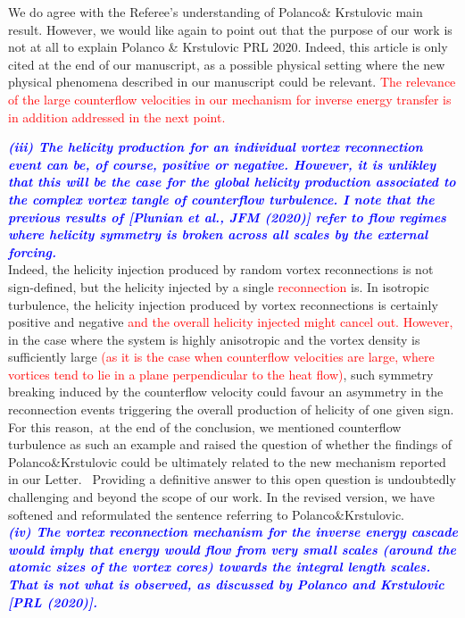 \documentclass[a4paper,10pt]{article}
\def\red#1{\textcolor{red}{#1}}
\def\blue#1{\textcolor{blue}{#1}}
\def\refcomment#1{\textbf{\blue{\emph{#1}}}\\}
\begin{document}
We do agree with the Referee’s understanding of Polanco\& Krstulovic main result. 
However, we would like again to point out that the purpose of our work is not at all to explain Polanco \& Krstulovic PRL 2020. Indeed, this article is only cited at the end of our manuscript, as a possible physical setting where the new physical phenomena described in our manuscript could be relevant. \red{The relevance of the large counterflow velocities in our mechanism for inverse energy transfer is in addition addressed in the next point.}
 


\refcomment{(iii) The helicity production for an individual vortex reconnection event can be, of course, positive or negative. However, it is unlikley that this will be the case for the global helicity production associated to the complex vortex tangle of counterflow turbulence. I note that the previous results of [Plunian et al., JFM (2020)] refer to flow regimes where helicity symmetry is broken across all scales by the external forcing.}

Indeed, the helicity injection produced by random vortex reconnections 
is not sign-defined, but the helicity injected by a single \red{reconnection}
is.  In isotropic turbulence, the helicity injection produced by vortex reconnections is certainly positive and negative \red{and the overall helicity injected
might cancel out. However,} in the case where the system is highly anisotropic and the vortex density is sufficiently large \red{(as it is the case when counterflow velocities are large, where vortices tend to lie in a plane perpendicular to the heat flow)}, such symmetry breaking induced by the counterflow velocity could favour an asymmetry in the reconnection events triggering the overall production of helicity of one given sign. For this reason, at the end of the conclusion, we mentioned counterflow turbulence as such an example and raised the question of whether the findings of Polanco\&Krstulovic could be ultimately related to the new mechanism reported in our Letter.  Providing a definitive answer to this open question is undoubtedly challenging and beyond the scope of our work. In the revised version, we have softened and reformulated the sentence referring to Polanco\&Krstulovic.\\

\refcomment{(iv) The vortex reconnection mechanism for the inverse energy cascade would imply that energy would flow from very small scales (around the atomic sizes of the vortex cores) towards the integral length scales. That is not what is observed, as discussed by Polanco and Krstulovic [PRL (2020)].}
\end{document}
